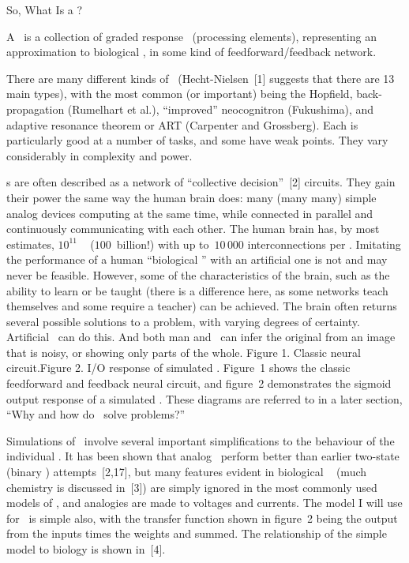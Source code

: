 \sec So, What Is a \NN?

A \nn\ is a collection of graded response \neus\ (processing elements),
representing an approximation to biological \neus, in some kind of
feedforward/feedback network.

There are many different kinds of \nns\ (Hecht-Nielsen~[1] suggests 
that there are 13
main types), with the most common (or important) being the Hopfield,
back-propagation (Rumelhart et al.), ``improved'' neocognitron (Fukushima), and
adaptive resonance theorem or ART (Carpenter and Grossberg).
Each is particularly good at a number of tasks, and some have weak
points.
They vary considerably in complexity and power.

\Nn s are often described as a network of ``collective decision''~[2]
circuits.
They gain their power the same way the human brain does: many (many
many) simple analog devices computing at the same time, while connected
in parallel and continuously communicating with each other.
The human brain has, by most estimates, $10^{11}$ \neus\ %
($100$~billion!) with up to~$10\,000$ interconnections per \neu.
Imitating the performance of a human ``biological \nn'' with an
artificial one is not and may never be feasible.
However, some of the characteristics of the brain, such as the ability
to learn or be taught (there is a difference here, as some networks
teach themselves and some require a teacher) can be achieved.
The brain often returns several possible solutions to a problem, with
varying degrees of certainty.
Artificial \nns\ can do this.
And both man and \nns\ can infer the original from an image that is
noisy, or showing only parts of the whole.
\goodbreak\midinsert\vskip 6cm
Figure 1. Classic neural circuit.\hfill Figure 2. I/O response of simulated
\neus.
\endinsert
Figure~1 shows the classic feedforward and feedback neural circuit, and
figure~2 demonstrates the sigmoid output response of a simulated \neu.
These diagrams are referred to in a later section, ``Why and how do
\nns\ solve problems?''

Simulations of \nns\ involve several important simplifications to the
behaviour of the individual \neus.
It has been shown that analog \neus\ perform better than earlier 
two-state (binary \neu) attempts~[2,17], but many features evident in 
biological \neus\ %
(much chemistry is discussed in~[3])
are simply ignored in the most commonly used models of \neus, and analogies
are made to voltages and currents.
The model I will use for \neus\ is simple also, with the transfer
function shown in figure~2 being the output from the inputs times the
weights and summed.
The relationship of the simple model to biology is shown in~[4].

